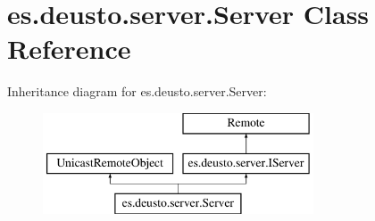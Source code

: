 \hypertarget{classes_1_1deusto_1_1server_1_1_server}{}\section{es.\+deusto.\+server.\+Server Class Reference}
\label{classes_1_1deusto_1_1server_1_1_server}
Inheritance diagram for es.\+deusto.\+server.\+Server\+:\begin{figure}[H]
\begin{center}
\leavevmode
\includegraphics[height=3.000000cm]{classes_1_1deusto_1_1server_1_1_server}
\end{center}
\end{figure}
